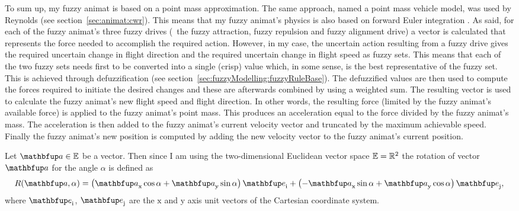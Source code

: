 To sum up, my fuzzy animat is based on a point mass approximation. The same approach, named a point mass vehicle model, was used by Reynolds \cite{reynolds:1987,reynolds:1999} (see section~\ref{sec:animat:cwr}). This means that my fuzzy animat's physics is also based on forward Euler integration \cite{parent:2002,reynolds:1999}. As said, for each of the fuzzy animat's three fuzzy drives (\ie\ the fuzzy attraction, fuzzy repulsion and fuzzy alignment drive) a vector is calculated that represents the force needed to accomplish the required action. However, in my case, the uncertain action resulting from a fuzzy drive gives the required uncertain change in flight direction and the required uncertain change in flight speed as fuzzy sets. This means that each of the two fuzzy sets needs first to be converted into a single (crisp) value which, in some sense, is the best representative of the fuzzy set. This is achieved through defuzzification (see section~\ref{sec:fuzzyModelling:fuzzyRuleBase}). The defuzzified values are then used to compute the forces required to initiate the desired changes and these are afterwards combined by using a weighted sum.  The resulting vector is used to calculate the fuzzy animat's new flight speed and flight direction. In other words, the resulting force (limited by the fuzzy animat's available force) is applied to the fuzzy animat's point mass. This produces an acceleration equal to the force divided by the fuzzy animat's mass. The acceleration is then added to the fuzzy animat's current velocity vector and truncated by the maximum achievable speed. Finally the fuzzy animat's new position is computed by adding the new velocity vector to the fuzzy animat's current position. 

Let $\vect{a} \in \E$ be a vector. Then since I am using the two-dimensional Euclidean vector space $\mathbb{E}=\mathbb{R}^2$ the rotation of vector $\vect{a}$ for the angle $\alpha$ is defined as
%
\begin{equation}
R(\vect{a}, \alpha) = \left(\vect{a}_\textnormal{x}\cos\alpha + \vect{a}_\textnormal{y}\sin\alpha\right)\vect{e}_\textnormal{i} + \left(-\vect{a}_\textnormal{x}\sin\alpha + \vect{a}_\textnormal{y}\cos\alpha\right)\vect{e}_\textnormal{j},
\end{equation}
%
where $\vect{e}_\textnormal{i}$, $\vect{e}_\textnormal{j}$ are the $\mathrm{x}$ and $\mathrm{y}$ axis unit vectors of the Cartesian coordinate system.

